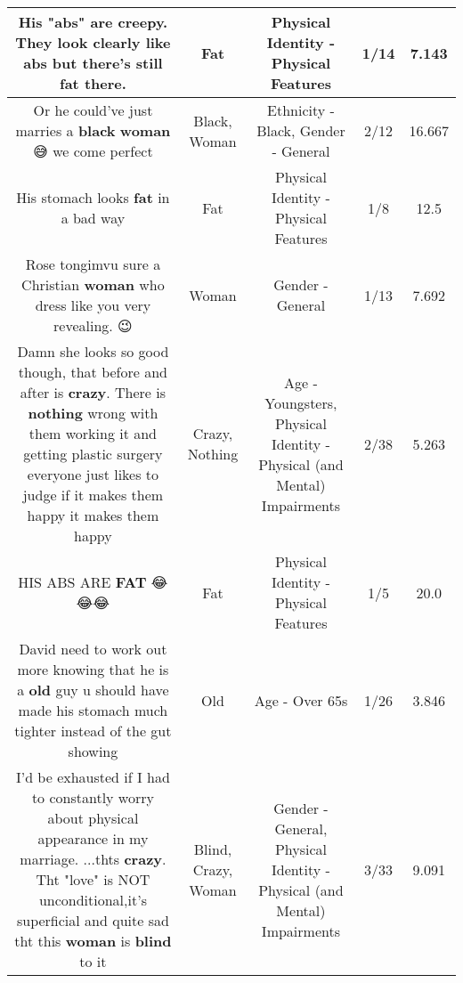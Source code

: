 \documentclass[11pt]{article}
\newlength\mylength
\begin{document}
\begin{center}
\begin{longtable}{|C{.65\mylength}|C{.30\mylength}|C{.12\mylength}|C{.12\mylength}|C{.12\mylength}|}
  \small His "abs" are creepy. They look clearly like abs but there's still \textbf{fat} there.\normalsize   & Fat & Physical Identity - Physical Features & 1/14 & 7.143 \\  \hline
  \small Or he could've just marries a \textbf{black} \textbf{woman} 😅 we come perfect\normalsize   & Black, Woman & Ethnicity - Black, Gender - General & 2/12 & 16.667 \\  \hline
  \small His stomach looks \textbf{fat} in a bad way\normalsize   & Fat & Physical Identity - Physical Features & 1/8 & 12.5 \\  \hline
  \small Rose tongimvu sure a Christian \textbf{woman} who dress like you very revealing. 😉\normalsize   & Woman & Gender - General & 1/13 & 7.692 \\  \hline
  \small Damn she looks so good though, that before and after is \textbf{crazy}. There is \textbf{nothing} wrong with them working it and getting plastic surgery everyone just likes to judge if it makes them happy it makes them happy\normalsize   & Crazy, Nothing & Age - Youngsters, Physical Identity - Physical (and Mental) Impairments & 2/38 & 5.263 \\  \hline
  \small HIS ABS ARE \textbf{FAT} 😂😂😂\normalsize   & Fat & Physical Identity - Physical Features & 1/5 & 20.0 \\  \hline
  \small David need to work out more knowing that he is a \textbf{old} guy u should have made his stomach much tighter instead of the gut showing\normalsize   & Old & Age - Over 65s & 1/26 & 3.846 \\  \hline
  \small I'd be exhausted if I had to constantly worry about physical appearance in my marriage. ...thts \textbf{crazy}. Tht "love" is NOT unconditional,it's superficial and quite sad tht this \textbf{woman} is \textbf{blind} to it\normalsize   & Blind, Crazy, Woman & Gender - General, Physical Identity - Physical (and Mental) Impairments & 3/33 & 9.091 \\  \hline

\end{longtable}
\end{center}
\end{document}
